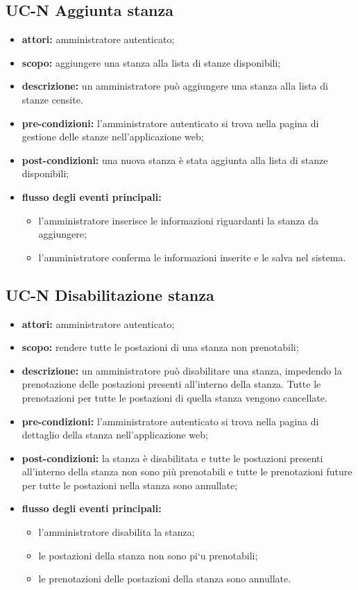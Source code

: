 \subsection{UC-N Aggiunta stanza}
\begin{itemize}
    \item \textbf{attori:} amministratore autenticato;
    \item \textbf{scopo:} aggiungere una stanza alla lista di stanze disponibili;
    \item \textbf{descrizione:} un amministratore pu\`{o} aggiungere una stanza alla lista di stanze censite.
    \item \textbf{pre-condizioni:} l'amministratore autenticato si trova nella pagina di gestione delle stanze nell'applicazione web;
    \item \textbf{post-condizioni:} una nuova stanza \`{e} stata aggiunta alla lista di stanze disponibili;
    \item \textbf{flusso degli eventi principali:}
    \begin{itemize}
        \item l'amministratore inserisce le informazioni riguardanti la stanza da aggiungere;
        \item l'amministratore conferma le informazioni inserite e le salva nel sistema.
    \end{itemize}
\end{itemize}


\subsection{UC-N Disabilitazione stanza}
\begin{itemize}
    \item \textbf{attori:} amministratore autenticato;
    \item \textbf{scopo:} rendere tutte le postazioni di una stanza non prenotabili;
    \item \textbf{descrizione:} un amministratore pu\`{o} disabilitare una stanza, impedendo la prenotazione delle postazioni presenti all'interno della stanza. Tutte le prenotazioni per tutte le postazioni di quella stanza vengono cancellate.
    \item \textbf{pre-condizioni:} l'amministratore autenticato si trova nella pagina di dettaglio della stanza nell'applicazione web;
    \item \textbf{post-condizioni:} la stanza \`{e} disabilitata e tutte le postazioni presenti all'interno della stanza non sono pi\`{u} prenotabili e tutte le prenotazioni future per tutte le postazioni nella stanza sono annullate;
    \item \textbf{flusso degli eventi principali:}
    \begin{itemize}
        \item l'amministratore disabilita la stanza;
        \item le postazioni della stanza non sono pi`{u} prenotabili;
        \item le prenotazioni delle postazioni della stanza sono annullate.
    \end{itemize}
\end{itemize}


